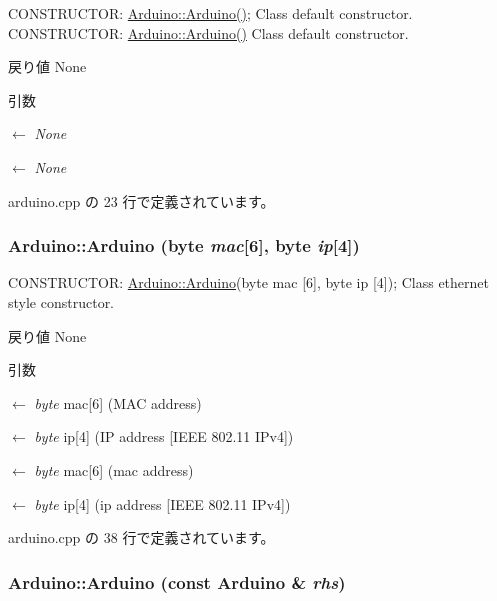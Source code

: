 CONSTRUCTOR: \hyperlink{classArduino_a625b4d718e488c7a7c13593b8abf9a43_a625b4d718e488c7a7c13593b8abf9a43}{Arduino::Arduino()}; Class default constructor. CONSTRUCTOR: \hyperlink{classArduino_a625b4d718e488c7a7c13593b8abf9a43_a625b4d718e488c7a7c13593b8abf9a43}{Arduino::Arduino()} Class default constructor.

\begin{DoxyReturn}{戻り値}
None 
\end{DoxyReturn}

\begin{DoxyParams}{引数}
\item[\mbox{$\leftarrow$} {\em None}]\item[\mbox{$\leftarrow$} {\em None}]\end{DoxyParams}


 arduino.cpp の 23 行で定義されています。\hypertarget{classArduino_af946ad1ba77bc602ee8e69923fb06e2d_af946ad1ba77bc602ee8e69923fb06e2d}{
\subsubsection[{Arduino}]{\setlength{\rightskip}{0pt plus 5cm}Arduino::Arduino (byte {\em mac}\mbox{[}6\mbox{]}, \/  byte {\em ip}\mbox{[}4\mbox{]})}}
\label{classArduino_af946ad1ba77bc602ee8e69923fb06e2d_af946ad1ba77bc602ee8e69923fb06e2d}


CONSTRUCTOR: \hyperlink{classArduino_a625b4d718e488c7a7c13593b8abf9a43_a625b4d718e488c7a7c13593b8abf9a43}{Arduino::Arduino}(byte mac \mbox{[}6\mbox{]}, byte ip \mbox{[}4\mbox{]}); Class ethernet style constructor. \begin{DoxyReturn}{戻り値}
None 
\end{DoxyReturn}

\begin{DoxyParams}{引数}
\item[\mbox{$\leftarrow$} {\em byte}]mac\mbox{[}6\mbox{]} (MAC address) \item[\mbox{$\leftarrow$} {\em byte}]ip\mbox{[}4\mbox{]} (IP address \mbox{[}IEEE 802.11 IPv4\mbox{]})\item[\mbox{$\leftarrow$} {\em byte}]mac\mbox{[}6\mbox{]} (mac address) \item[\mbox{$\leftarrow$} {\em byte}]ip\mbox{[}4\mbox{]} (ip address \mbox{[}IEEE 802.11 IPv4\mbox{]}) \end{DoxyParams}


 arduino.cpp の 38 行で定義されています。\hypertarget{classArduino_abb555c50c1812b3b81211ffc490ff70f_abb555c50c1812b3b81211ffc490ff70f}{
\subsubsection[{Arduino}]{\setlength{\rightskip}{0pt plus 5cm}Arduino::Arduino (const {\bf Arduino} \& {\em rhs})}}
\label{classArduino_abb555c50c1812b3b81211ffc490ff70f_abb555c50c1812b3b81211ffc490ff70f}


